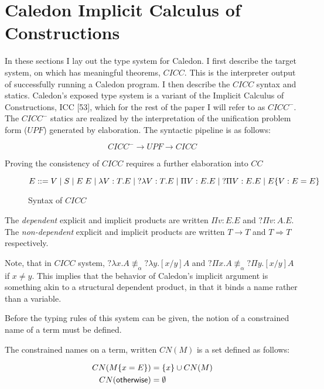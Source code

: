 \section{Caledon Implicit Calculus of Constructions}


In these sections I lay out the type system for Caledon. I first describe the target system,
on which has meaningful theorems, $CICC$. 
This is the interpreter output of successfully running a Caledon program. 
I then describe the $CICC$ syntax and statics. 
Caledon’s exposed type system is a variant of the Implicit Calculus of Constructions, ICC [53],
which for the rest of the paper I will refer to as $CICC^-$. The $CICC^-$ statics are realized
by the interpretation of the unification problem form ($UPF$) generated by elaboration.
The syntactic pipeline is as follows:


\[
CICC^- \rightarrow UPF \rightarrow CICC
\]

Proving the consistency of $CICC$ requires a further elaboration into $CC$

\begin{figure}[H]
\[ 
E ::= 
V 
\; | \; S 
\; | \; E\;E 
\; | \; \lambda V : T. E 
\; | \; ?\lambda V : T. E 
\; | \; \Pi V : E . E 
\; | \; ?\Pi V : E . E 
\; | \; E \{ V : E = E \}
\]

\caption{Syntax of $CICC$}
\label{cicc:syntax}
\end{figure}

The \textit{dependent} explicit and implicit products are written $\Pi v : E . E $ and $?\Pi v : A . E$. 
The \textit{non-dependent} explicit and implicit products are written $T \rightarrow T$ 
and $T \Rightarrow T$ respectively.

Note, that in $CICC$ system, $?\lambda x . A \not\equiv_\alpha ?\lambda y . [x / y] A$ 
and $?\Pi x . A \not\equiv_\alpha ?\Pi y . [x / y] A$  if $x \neq y$.  
This implies that the behavior of Caledon's implicit argument is something akin to a structural dependent product, in that it binds a name rather than a variable.   

Before the typing rules of this system can be given, the notion of a constrained name of a term must be defined.

\begin{definition}
The constrained names on a term, written $CN(M)$ is a set defined as follows:

\begin{align}
CN(M \{ x = E \}) &= \{ x \} \cup CN(M)
\\
CN(\mathsf{otherwise}) &= \emptyset
\end{align}

\end{definition}

